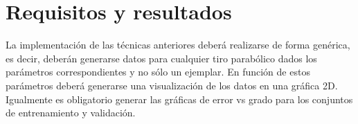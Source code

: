 \section{Requisitos y resultados}

La implementación de las técnicas anteriores deberá realizarse de forma genérica, es decir, deberán generarse datos para cualquier tiro parabólico dados los parámetros correspondientes y no sólo un ejemplar.  En función de estos parámetros deberá generarse una visualización de los datos en una gráfica 2D.  Igualmente es obligatorio generar las gráficas de error vs grado para los conjuntos de entrenamiento y validación.
